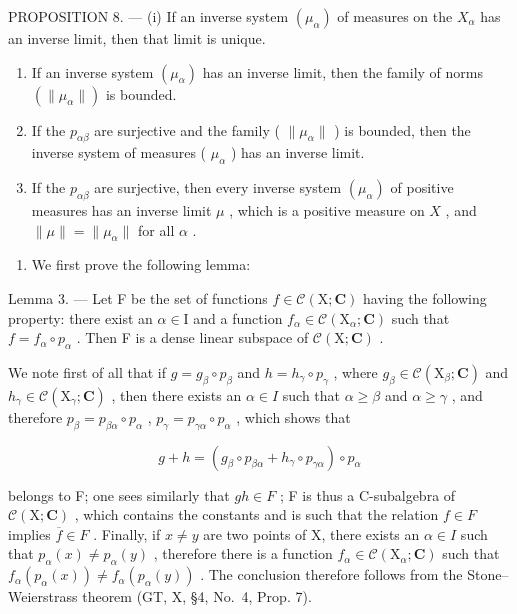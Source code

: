 PROPOSITION 8. --- (i) If an inverse system \((\mu_{\alpha})\) of measures on the \(X_{\alpha}\) has an inverse limit, then that limit is unique.

\begin{enumerate}
\def\labelenumi{(\roman{enumi})}
\setcounter{enumi}{1}
\item
  If an inverse system \((\mu_{\alpha})\) has an inverse limit, then the family of norms \((\| \mu_{\alpha}\|)\) is bounded.
\item
  If the \(p_{\alpha\beta}\) are surjective and the family ( \(\|\mu_{\alpha}\|\) ) is bounded, then the inverse system of measures ( \(\mu_{\alpha}\) ) has an inverse limit.
\item
  If the \(p_{\alpha \beta}\) are surjective, then every inverse system \((\mu_{\alpha})\) of positive measures has an inverse limit \(\mu\) , which is a positive measure on \(X\) , and \(\| \mu \| = \| \mu_{\alpha} \|\) for all \(\alpha\) .
\end{enumerate}

\begin{enumerate}
\def\labelenumi{(\roman{enumi})}
\tightlist
\item
  We first prove the following lemma:
\end{enumerate}

Lemma 3. --- Let F be the set of functions \(f \in \mathcal{C}(\mathrm{X};\mathbf{C})\) having the following property: there exist an \(\alpha \in \mathrm{I}\) and a function \(f_{\alpha} \in \mathcal{C}(\mathrm{X}_{\alpha};\mathbf{C})\) such that \(f = f_{\alpha} \circ p_{\alpha}\) . Then F is a dense linear subspace of \(\mathcal{C}(\mathrm{X};\mathbf{C})\) .

We note first of all that if \(g = g_{\beta} \circ p_{\beta}\) and \(h = h_{\gamma} \circ p_{\gamma}\) , where \(g_{\beta} \in \mathcal{C}(\mathrm{X}_{\beta}; \mathbf{C})\) and \(h_{\gamma} \in \mathcal{C}(\mathrm{X}_{\gamma}; \mathbf{C})\) , then there exists an \(\alpha \in I\) such that \(\alpha \geqslant \beta\) and \(\alpha \geqslant \gamma\) , and therefore \(p_{\beta} = p_{\beta\alpha} \circ p_{\alpha}\) , \(p_{\gamma} = p_{\gamma\alpha} \circ p_{\alpha}\) , which shows that

\[
g + h = \left(g _ {\beta} \circ p _ {\beta \alpha} + h _ {\gamma} \circ p _ {\gamma \alpha}\right) \circ p _ {\alpha}
\]

belongs to F; one sees similarly that \(gh \in F\) ; F is thus a C-subalgebra of \(\mathcal{C}(\mathrm{X};\mathbf{C})\) , which contains the constants and is such that the relation \(f \in F\) implies \(\overline{f} \in F\) . Finally, if \(x \neq y\) are two points of X, there exists an \(\alpha \in I\) such that \(p_{\alpha}(x) \neq p_{\alpha}(y)\) , therefore there is a function \(f_{\alpha} \in \mathcal{C}(\mathrm{X}_{\alpha};\mathbf{C})\) such that \(f_{\alpha}(p_{\alpha}(x)) \neq f_{\alpha}(p_{\alpha}(y))\) . The conclusion therefore follows from the Stone--Weierstrass theorem (GT, X, §4, No.~4, Prop. 7).

